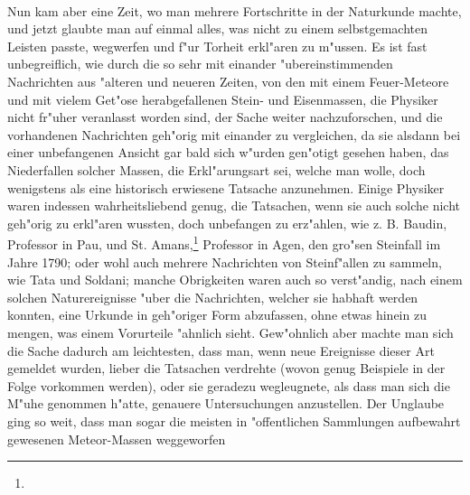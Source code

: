\documentclass[a4paper, 11pt, oneside, polutonikogreek, german]{article}
\begin{document}
\paragraph{}
Nun kam aber eine Zeit, wo man mehrere Fortschritte in der Naturkunde machte, und jetzt glaubte man auf einmal alles, was nicht zu einem selbstgemachten Leisten passte, wegwerfen und f"ur Torheit erkl"aren zu m"ussen. Es ist fast unbegreiflich, wie durch die so sehr mit einander "ubereinstimmenden Nachrichten aus "alteren und neueren Zeiten, von den mit einem Feuer-Meteore und mit vielem Get"ose herabgefallenen Stein- und Eisenmassen, die Physiker nicht fr"uher veranlasst worden sind, der Sache weiter nachzuforschen, und die vorhandenen Nachrichten geh"orig mit einander zu vergleichen, da sie alsdann bei einer unbefangenen Ansicht gar bald sich w"urden gen"otigt gesehen haben, das Niederfallen solcher Massen, die Erkl"arungsart sei, welche man wolle, doch wenigstens als eine historisch erwiesene Tatsache anzunehmen. Einige Physiker waren indessen wahrheitsliebend genug, die Tatsachen, wenn sie auch solche nicht geh"orig zu erkl"aren wussten, doch unbefangen zu erz"ahlen, wie z. B. Baudin, Professor in Pau, und St. Amans,\footnote{} Professor in Agen, den gro"sen Steinfall im Jahre 1790; oder wohl auch mehrere Nachrichten von Steinf"allen zu sammeln, wie Tata und Soldani; manche Obrigkeiten waren auch so verst"andig, nach einem solchen Naturereignisse "uber die Nachrichten, welcher sie habhaft werden konnten, eine Urkunde in geh"origer Form abzufassen, ohne etwas hinein zu mengen, was einem Vorurteile "ahnlich sieht. Gew"ohnlich aber machte man sich die Sache dadurch am leichtesten, dass man, wenn neue Ereignisse dieser Art gemeldet wurden, lieber die Tatsachen verdrehte (wovon genug Beispiele in der Folge vorkommen werden), oder sie geradezu wegleugnete, als dass man sich die M"uhe genommen h"atte, genauere Untersuchungen anzustellen. Der Unglaube ging so weit, dass man sogar die meisten in "offentlichen Sammlungen aufbewahrt gewesenen Meteor-Massen weggeworfen 
\end{document}
